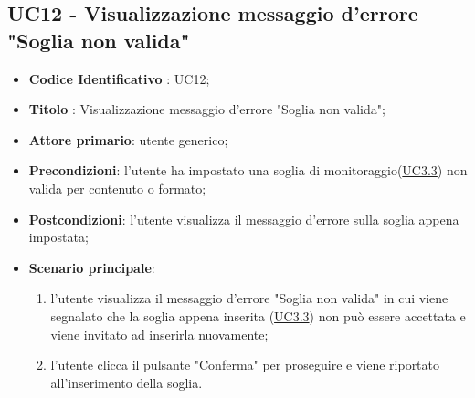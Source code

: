 	\subsection{UC12 - Visualizzazione messaggio d'errore "Soglia non valida"}
		\begin{itemize}
			\item\textbf{Codice Identificativo} : UC12;
			\item\textbf{Titolo} : Visualizzazione messaggio d'errore "Soglia non valida";
			\item\textbf{Attore primario}: utente generico;
			\item\textbf{Precondizioni}: l'utente ha impostato una soglia di monitoraggio(\hyperref[par:UC3.3]{UC3.3}) non valida per contenuto o formato;
			\item\textbf{Postcondizioni}: l'utente visualizza il messaggio d'errore sulla soglia appena impostata;		
			\item\textbf{Scenario principale}:
				\begin{enumerate}
					\item l'utente visualizza il messaggio d'errore "Soglia non valida" in cui viene segnalato che la soglia appena inserita (\hyperref[par:UC3.3]{UC3.3}) non può essere accettata e viene invitato ad inserirla nuovamente;
					\item l'utente clicca il pulsante "Conferma" per proseguire e viene riportato all'inserimento della soglia.		
				\end{enumerate}		
		\end{itemize}


	\label{par:UC13}
